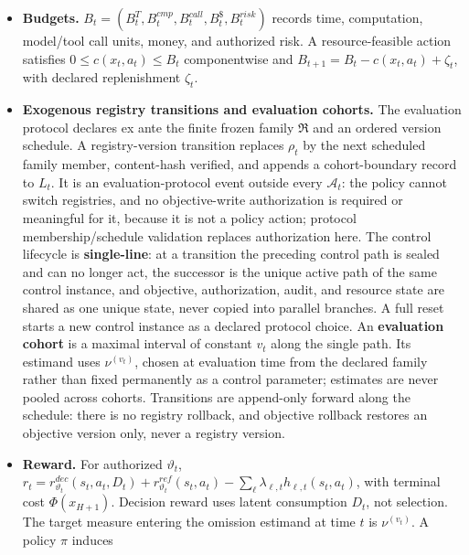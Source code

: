 \documentclass[
  11pt]{article}
\begin{document}
\begin{itemize}
  \(\mathcal A^{att}_t\) so rejection can be logged; they are not
  silently removed from the action space. Guard acceptance is a
  transition constraint, not a reason to erase the attempt.
\item
  \textbf{Budgets.}
  \(B_t=(B_t^T,B_t^{cmp},B_t^{call},B_t^{\$},B_t^{risk})\) records time,
  computation, model/tool call units, money, and authorized risk. A
  resource-feasible action satisfies \(0\le c(x_t,a_t)\le B_t\)
  componentwise and \(B_{t+1}=B_t-c(x_t,a_t)+\zeta_t\), with declared
  replenishment \(\zeta_t\).
\item
  \textbf{Exogenous registry transitions and evaluation cohorts.} The
  evaluation protocol declares ex ante the finite frozen family
  \(\mathfrak R\) and an ordered version schedule. A registry-version
  transition replaces \(\rho_t\) by the next scheduled family member,
  content-hash verified, and appends a cohort-boundary record to
  \(L_t\). It is an evaluation-protocol event outside every
  \(\mathcal A_t\): the policy cannot switch registries, and no
  objective-write authorization is required or meaningful for it,
  because it is not a policy action; protocol membership/schedule
  validation replaces authorization here. The control lifecycle is
  \textbf{single-line}: at a transition the preceding control path is
  sealed and can no longer act, the successor is the unique active path
  of the same control instance, and objective, authorization, audit, and
  resource state are shared as one unique state, never copied into
  parallel branches. A full reset starts a new control instance as a
  declared protocol choice. An \textbf{evaluation cohort} is a maximal
  interval of constant \(v_t\) along the single path. Its estimand uses
  \(\nu^{(v_t)}\), chosen at evaluation time from the declared family
  rather than fixed permanently as a control parameter; estimates are
  never pooled across cohorts. Transitions are append-only forward along
  the schedule: there is no registry rollback, and objective rollback
  restores an objective version only, never a registry version.
\item
  \textbf{Reward.} For authorized \(\vartheta_t\),
  \(r_t=r^{dec}_{\vartheta_t}(s_t,a_t,D_t)+r^{ref}_{\vartheta_t}(s_t,a_t)-\sum_\ell\lambda_{\ell,t}h_{\ell,t}(s_t,a_t)\),
  with terminal cost \(\Phi(x_{H+1})\). Decision reward uses latent
  consumption \(D_t\), not selection. The target measure entering the
  omission estimand at time \(t\) is \(\nu^{(v_t)}\). A policy \(\pi\)
  induces
\end{itemize}
\end{document}
